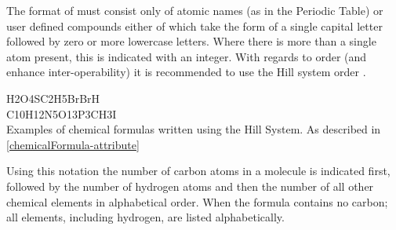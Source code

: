 The format of  must consist only of atomic names (as in
the Periodic Table) or user defined compounds either of which take the form of
a single capital letter followed by zero or more lowercase letters. Where there
is more than a single atom present, this is indicated with an integer. With
regards to order (and enhance inter-operability) it is recommended to use the
Hill system order \citep{hillsystem, hillwikipedia}.

%
\begin{table}[h!]
  H2O4S\qquad C2H5Br\qquad BrH\\
  C10H12N5O13P3\qquad CH3I\\
  \caption{Examples of chemical formulas written using the Hill System. As
	described in \ref{chemicalFormula-attribute}}\label{table:hill}
\end{table}
%
Using this notation the number of carbon atoms in a molecule is indicated
first, followed by the number of hydrogen atoms and then the number of all
other chemical elements in alphabetical order. When the formula contains no
carbon; all elements, including hydrogen, are listed alphabetically.

